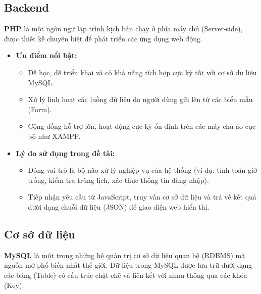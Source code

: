 \subsection{Backend}
\textbf{PHP} là một ngôn ngữ lập trình kịch bản chạy ở phía máy chủ
(Server-side), được thiết kế chuyên biệt để phát triển các ứng dụng web
động.

\begin{itemize}
\item
	\textbf{Ưu điểm nổi bật:}

	\begin{itemize}
	\item
		Dễ học, dễ triển khai và có khả năng tích hợp cực kỳ tốt với cơ sở
		dữ liệu MySQL.
	\item
		Xử lý linh hoạt các luồng dữ liệu do người dùng gửi lên từ các biểu
		mẫu (Form).
	\item
		Cộng đồng hỗ trợ lớn, hoạt động cực kỳ ổn định trên các máy chủ ảo
		cục bộ như XAMPP.
	\end{itemize}
\item
	\textbf{Lý do sử dụng trong đề tài:}

	\begin{itemize}
	\item
		Đóng vai trò là bộ não xử lý nghiệp vụ của hệ thống (ví dụ: tính
		toán giờ trống, kiểm tra trùng lịch, xác thực thông tin đăng nhập).
	\item
		Tiếp nhận yêu cầu từ JavaScript, truy vấn cơ sở dữ liệu và trả về
		kết quả dưới dạng chuỗi dữ liệu (JSON) để giao diện web hiển thị.
	\end{itemize}
\end{itemize}

\subsection{Cơ sở dữ liệu}
\textbf{MySQL} là một trong những hệ quản trị cơ sở dữ liệu quan hệ
(RDBMS) mã nguồn mở phổ biến nhất thế giới. Dữ liệu trong MySQL được
lưu trữ dưới dạng các bảng (Table) có cấu trúc chặt chẽ và liên kết với
nhau thông qua các khóa (Key).

